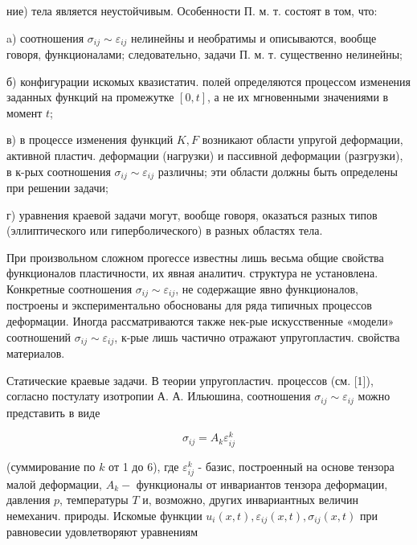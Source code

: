 \documentclass[10pt]{article}
\begin{document}
ние) тела является неустойчивым. Особенности П. м. т. состоят в том, что:



a) соотношения $\sigma_{i j} \sim \varepsilon_{i j}$ нелинейны и необратимы и описываются, вообще говоря, функционалами; следовательно, задачи П. м. т. существенно нелинейны;



б) конфигурации искомых квазистатич. полей определяются процессом изменения заданных функций на промежутке $[0, t]$, а не их мгновенными значениями в момент $t$;



в) в процессе изменения функций $K, F$ возникают области упругой деформации, активной пластич. деформации (нагрузки) и пассивной деформации (разгрузки), в к-рых соотношения $\sigma_{i j} \sim \varepsilon_{i j}$ различны; эти области должны быть определены при решении задачи;



г) уравнения краевой задачи могут, вообще говоря, оказаться разных типов (эллиптического или гиперболического) в разных областях тела.



При произвольном сложном прогессе известны лишь весьма общие свойства функционалов пластичности, их явная аналитич. структура не установлена. Конкретные соотношения $\sigma_{i j} \sim \varepsilon_{i j}$, не содержащие явно функционалов, построены и экспериментально обоснованы для ряда типичных процессов деформации. Иногда рассматриваются также нек-рые искусственные «модели» соотношений $\sigma_{i j} \sim \varepsilon_{i j}$, к-рые лишь частично отражают упругопластич. свойства материалов.



Статические краевые задачи. В теории упругопластич. процессов (см. [1]), согласно постулату изотропии А. А. Ильюшина, соотношения $\sigma_{i j} \sim \varepsilon_{i j}$ можно представить в виде



\[

\sigma_{i j}=A_{k} \varepsilon_{i j}^{k}

\]



(суммирование по $k$ от 1 до 6), где $\varepsilon_{i j}^{k}$ - базис, построенный на основе тензора малой деформации, $A_{k}-$ функционалы от инвариантов тензора деформации, давления $p$, температуры $T$ и, возможно, других инвариантных величин немеханич. природы. Искомые функции $u_{i}(x, t), \varepsilon_{i j}(x, t), \sigma_{i j}(x, t)$ при равновесии удовлетворяют уравнениям
\end{document}

